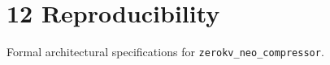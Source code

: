 \section{12 Reproducibility}

Formal architectural specifications for \texttt{zerokv_neo_compressor}.
